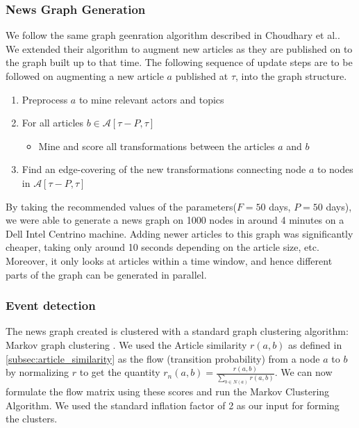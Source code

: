 \subsubsection*{News Graph Generation}\label{sec:graph-desc}
We follow the same graph geenration algorithm described in Choudhary et al.\cite{choudhary@ecir2008}. We extended their algorithm to
augment new articles as they are published on to the graph built up to that time. The following sequence of update steps are to
be followed on augmenting a new article $a$ published at $\tau$, into the graph structure.
\begin{enumerate}
  \item Preprocess $a$ to mine relevant actors and topics
  \item For all articles $b \in \mathcal{A}[\tau - P, \tau]$
  \begin{itemize}
  \item Mine and score all transformations between the articles $a$ and $b$
  \end{itemize}
  \item Find an edge-covering of the new transformations connecting node $a$ to nodes in $\mathcal{A}[\tau - P, \tau]$
\end{enumerate}

By taking the recommended values of the parameters($F=50$ days, $P=50$ days), we were able to generate a news graph on 1000 nodes in around 4 minutes on a Dell Intel Centrino machine.
Adding newer articles to this graph was significantly cheaper, taking only around 10 seconds depending on the article size, etc.
Moreover, it only looks at articles within a time window, and hence different parts of the graph can be generated in parallel.

\subsubsection*{Event detection}
\label{sec:event-detection-summary-context}
The news graph created is clustered with a standard graph clustering algorithm: Markov graph clustering \cite{Dongen00a}.
We used the Article similarity $r(a,b)$ as defined in \ref{subsec:article_similarity} as the flow (transition probability) from a node $a$ to $b$ by normalizing $r$ to get the quantity $r_n(a, b) = \frac{r(a, b)}{\sum_{b \in N(a)}r(a, b)}$. We can now formulate the flow matrix using these scores and run the Markov Clustering Algorithm. We used the standard inflation factor of 2 as our input for forming the clusters. 

